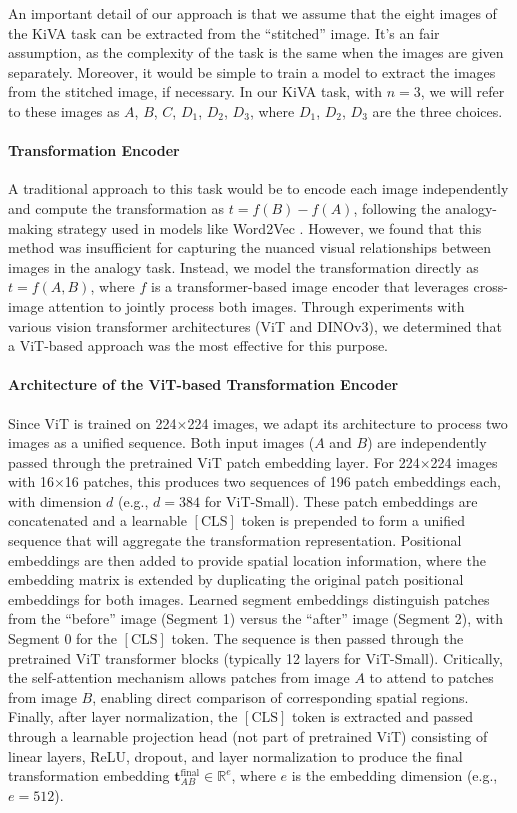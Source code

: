 \documentclass[twocolumn]{article} %
\begin{document}
An important detail of our approach is that we assume that the eight images of the KiVA task can be extracted from the ``stitched'' image. It's an fair assumption, as the complexity of the task is the same when the images are given separately. Moreover, it would be simple to train a model to extract the images from the stitched image, if necessary. In our KiVA task, with $n=3$, we will refer to these images as $A$, $B$, $C$, $D_1$, $D_2$, $D_3$, where $D_1$, $D_2$, $D_3$ are the three choices. 

\paragraph{Transformation Encoder}

A traditional approach to this task would be to encode each image independently and compute the transformation as \(t = f(B) - f(A)\), following the analogy-making strategy used in models like Word2Vec \cite{mikolov2013efficient}. However, we found that this method was insufficient for capturing the nuanced visual relationships between images in the analogy task. Instead, we model the transformation directly as \(t = f(A, B)\), where $f$ is a transformer-based image encoder that leverages cross-image attention to jointly process both images. Through experiments with various vision transformer architectures (ViT and DINOv3), we determined that a ViT-based approach was the most effective for this purpose.

\paragraph{Architecture of the ViT-based Transformation Encoder}
Since ViT is trained on 224$\times$224 images, we adapt its architecture to process two images as a unified sequence. Both input images ($A$ and $B$) are independently passed through the pretrained ViT patch embedding layer. For 224$\times$224 images with 16$\times$16 patches, this produces two sequences of 196 patch embeddings each, with dimension $d$ (e.g., $d=384$ for ViT-Small). These patch embeddings are concatenated and a learnable $[\text{CLS}]$ token is prepended to form a unified sequence that will aggregate the transformation representation. Positional embeddings are then added to provide spatial location information, where the embedding matrix is extended by duplicating the original patch positional embeddings for both images. Learned segment embeddings distinguish patches from the ``before'' image (Segment 1) versus the ``after'' image (Segment 2), with Segment 0 for the $[\text{CLS}]$ token. The sequence is then passed through the pretrained ViT transformer blocks (typically 12 layers for ViT-Small). Critically, the self-attention mechanism allows patches from image $A$ to attend to patches from image $B$, enabling direct comparison of corresponding spatial regions. Finally, after layer normalization, the $[\text{CLS}]$ token is extracted and passed through a learnable projection head (not part of pretrained ViT) consisting of linear layers, ReLU, dropout, and layer normalization to produce the final transformation embedding $\mathbf{t}_{AB}^{\text{final}} \in \mathbb{R}^{e}$, where $e$ is the embedding dimension (e.g., $e=512$). 
\end{document}
